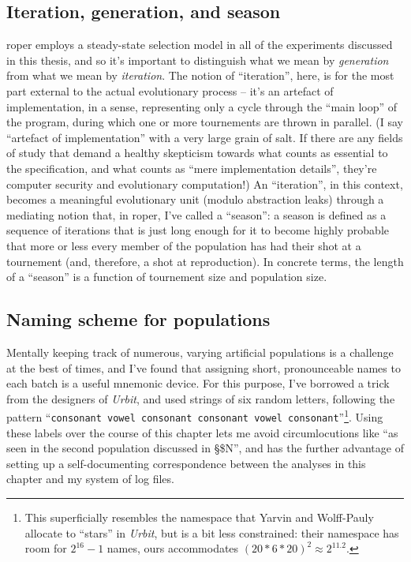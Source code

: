 \documentclass[12pt,glossary]{dalthesis}
\begin{document}
\subsection{Iteration, generation, and season}
\label{sec:orgf2d1f76}
\label{orga022e12}

\Gls{roper} employs a steady-state selection model in all of the experiments
discussed in this thesis, and so it's important to distinguish what we mean
by \emph{generation} from what we mean by \emph{iteration}. The notion of ``iteration'',
here, is for the most part external to the actual evolutionary process -- it's 
an artefact of implementation, in a sense, representing only a cycle through
the ``main loop'' of the program, during which one or more tournements are thrown
in parallel. (I say ``artefact of implementation'' with a very large grain of
salt. If there are any fields of study that demand a healthy skepticism towards
what counts as essential to the specification, and what counts as ``mere
implementation details'', they're computer security and evolutionary computation!)
An ``iteration'', in this context, becomes a meaningful evolutionary unit
(modulo abstraction leaks) through a mediating notion that, in \gls{roper},
I've called a ``season'': a season is defined as a sequence of iterations that
is just long enough for it to become highly probable that more or less 
every member of the population has had their shot at a tournement (and, therefore,
a shot at reproduction). In concrete terms, the length of a ``season'' is a
function of tournement size and population size. 

\subsection{Naming scheme for populations}
\label{sec:orgaac97fb}
\label{org94c86c9}

Mentally keeping track of numerous, varying artificial populations is a challenge at the
best of times, and I've found that assigning short,
pronounceable names to each batch is a useful mnemonic device. For this purpose,
I've borrowed a trick from the designers of \emph{Urbit}, and used strings of six
random letters, following the pattern ``\texttt{consonant vowel consonant consonant vowel consonant}''\footnote{This superficially resembles the namespace that Yarvin and Wolff-Pauly allocate
  to ``stars'' in \emph{Urbit}, but is a bit less constrained: their namespace has room
  for \(2^{16}-1\) names, ours accommodates \((20 * 6 * 20)^2 \approx 2^{11.2}\).}. Using these labels over the course of this chapter lets me avoid circumlocutions
like ``as seen in the second population discussed in \S \$N'', and has the
further advantage of setting up a self-documenting correspondence between the
analyses in this chapter and my system of log files. 
\end{document}

